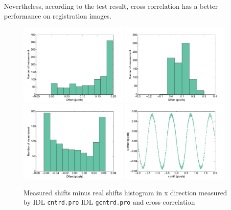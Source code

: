 \documentclass[paper=letter, fontsize=11pt]{scrartcl} %
\numberwithin{equation}{section} %
\numberwithin{figure}{section} %
\numberwithin{table}{section} %
\begin{document}
Nevertheless, according to the test result, cross correlation has a better
performance on registration images.\par

\begin{figure}
  \centering
  \includegraphics[width=0.48\textwidth]{cntrd_off2}
  \includegraphics[width=0.48\textwidth]{gcntrd_off2}\\
  \includegraphics[width=0.48\textwidth]{crosscorr_off2}
  \includegraphics[width=0.48\textwidth]{crosscorr_cenTes.pdf}\\
  \caption{Measured shifts minus real shifts histogram in x direction
    measured by IDL \texttt{cntrd.pro} IDL \texttt{gcntrd.pro} and
    cross correlation}
  \label{fig:shift1}
\end{figure}
\end{document}
